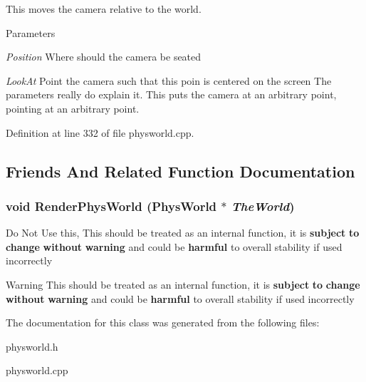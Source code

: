 This moves the camera relative to the world. 
\begin{DoxyParams}{Parameters}
\item[{\em Position}]Where should the camera be seated \item[{\em LookAt}]Point the camera such that this poin is centered on the screen The parameters really do explain it. This puts the camera at an arbitrary point, pointing at an arbitrary point. \end{DoxyParams}


Definition at line 332 of file physworld.cpp.

\subsection{Friends And Related Function Documentation}
\hypertarget{classPhysWorld_a54ca2a75bbccb9b2129f434874f1e693}{
\subsubsection[{RenderPhysWorld}]{\setlength{\rightskip}{0pt plus 5cm}void RenderPhysWorld ({\bf PhysWorld} $\ast$ {\em TheWorld})}}
\label{db/df5/classPhysWorld_a54ca2a75bbccb9b2129f434874f1e693}
Do Not Use this, This should be treated as an internal function, it is {\bfseries subject} {\bfseries to} {\bfseries change} {\bfseries without} {\bfseries warning} and could be {\bfseries harmful} to overall stability if used incorrectly \begin{DoxyWarning}{Warning}
This should be treated as an internal function, it is {\bfseries subject} {\bfseries to} {\bfseries change} {\bfseries without} {\bfseries warning} and could be {\bfseries harmful} to overall stability if used incorrectly 
\end{DoxyWarning}


The documentation for this class was generated from the following files:\begin{DoxyCompactItemize}
\item 
physworld.h\item 
physworld.cpp\end{DoxyCompactItemize}
